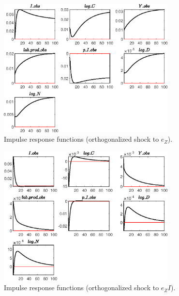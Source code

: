  
\begin{figure}[H]
\centering 
\includegraphics[width=0.80\textwidth]{BRS/graphs/BRS_IRF_e_Z}
\caption{Impulse response functions (orthogonalized shock to ${e_Z}$).}
\label{Fig:IRF:e_Z}
\end{figure}
 
\begin{figure}[H]
\centering 
\includegraphics[width=0.80\textwidth]{BRS/graphs/BRS_IRF_e_ZI}
\caption{Impulse response functions (orthogonalized shock to ${e_ZI}$).}
\label{Fig:IRF:e_ZI}
\end{figure}
 
